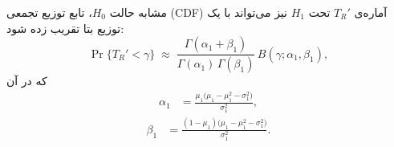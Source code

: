 مشابه حالت $H_{0}$، تابع توزیع تجمعی (CDF) آماره‌ی $T_{R}'$ تحت $H_{1}$ نیز می‌تواند با یک توزیع بتا تقریب زده شود:
\begin{equation}
	\Pr\{T_{R}' < \gamma\} \;\approx\;
	\frac{\Gamma(\alpha_{1}+\beta_{1})}{\Gamma(\alpha_{1})\,\Gamma(\beta_{1})}\,
	B(\gamma;\alpha_{1},\beta_{1}),
\end{equation}
که در آن
\begin{align}
	\alpha_{1}&=\frac{\mu_{1}\big(\mu_{1}-\mu_{1}^{2}-\sigma_{1}^{2}\big)}{\sigma_{1}^{2}},
\end{align}
\begin{align}
	\beta_{1}&=\frac{(1-\mu_{1})\big(\mu_{1}-\mu_{1}^{2}-\sigma_{1}^{2}\big)}{\sigma_{1}^{2}}.
\end{align}

